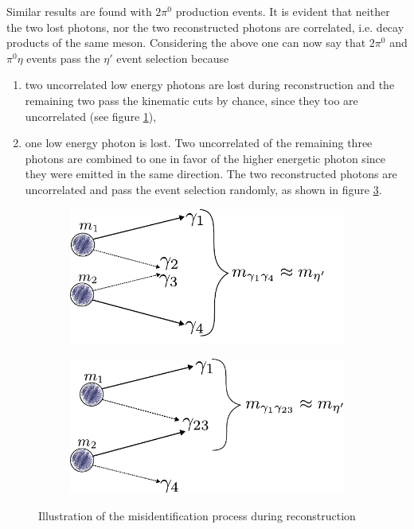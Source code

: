 Similar results are found with $2\pi^0$ production events. It is evident that neither the two lost photons, nor the two reconstructed photons are correlated, i.e. decay products of the same meson.
\newpage
Considering the above one can now say that $2\pi^0$ and $\pi^0\eta$ events pass the $\eta'$ event selection because 
\begin{enumerate}
	\item two uncorrelated low energy photons are lost during reconstruction and the remaining two pass the kinematic cuts by chance, since they too are uncorrelated (see figure \ref{fig:mcgammas1}),

	\item one low energy photon is lost. Two uncorrelated of the remaining three photons are combined to one in favor of the higher energetic photon since they were emitted in the same direction. The two reconstructed photons are uncorrelated and pass the event selection randomly, as shown in figure \ref{fig:mcgammas2}.
\end{enumerate} 
	\begin{figure}[h]
	\centering
	\begin{subfigure}{.49\linewidth}
		\includegraphics[width=\linewidth]{../figs/inkscape/mcgammas1.pdf}
		\label{fig:mcgammas1}
	\end{subfigure}
	\begin{subfigure}{.49\linewidth}
		\includegraphics[width=\linewidth]{../figs/inkscape/mcgammas2.pdf}
		\label{fig:mcgammas2}
	\end{subfigure}
	\caption{Illustration of the misidentification process during reconstruction}

\end{figure}
